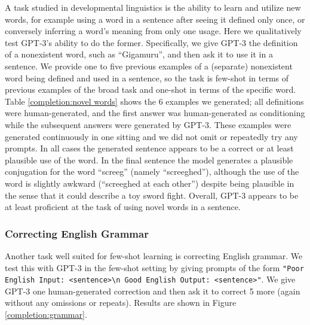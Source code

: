 \documentclass{article}
\begin{document}
        A task studied in developmental linguistics \cite{carey1978acquiring} is the ability to learn and utilize new words, for example using a word in a sentence after seeing it defined only once, or conversely inferring a word’s meaning from only one usage.  Here we qualitatively test GPT-3’s ability to do the former.  Specifically, we give GPT-3 the definition of a nonexistent word, such as ``Gigamuru'', and then ask it to use it in a sentence.  We provide one to five previous examples of a (separate) nonexistent word being defined and used in a sentence, so the task is few-shot in terms of previous examples of the broad task and one-shot in terms of the specific word.  Table \ref{completion:novel words} shows the 6 examples we generated; all definitions were human-generated, and the first answer was human-generated as conditioning while the subsequent answers were generated by GPT-3.  These examples were generated continuously in one sitting and we did not omit or repeatedly try any prompts.  In all cases the generated sentence appears to be a correct or at least plausible use of the word.  In the final sentence the model generates a plausible conjugation for the word ``screeg'' (namely ``screeghed''), although the use of the word is slightly awkward (``screeghed at each other'') despite being plausible in the sense that it could describe a toy sword fight.  Overall, GPT-3 appears to be at least proficient at the task of using novel words in a sentence.

         
        \subsubsection{Correcting English Grammar}
        \label{section:Correcting_English_Grammar}
        Another task well suited for few-shot learning is correcting English grammar.  We test this with GPT-3 in the few-shot setting by giving prompts of the form \texttt{"Poor English Input: <sentence>{\textbackslash}n Good English Output: <sentence>"}.  We give GPT-3 one human-generated correction and then ask it to correct 5 more (again without any omissions or repeats).  Results are shown in Figure \ref{completion:grammar}.
\end{document}
